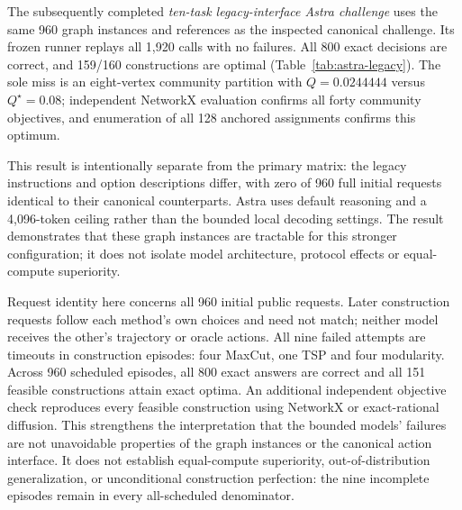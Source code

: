 The subsequently completed \emph{ten-task legacy-interface Astra challenge}
uses the same 960 graph instances and references as the inspected canonical
challenge. Its frozen runner replays all 1,920 calls with no failures.
All 800 exact decisions are correct, and 159/160 constructions are optimal
(Table~\ref{tab:astra-legacy}). The sole miss is an eight-vertex community
partition with $Q=0.0244444$ versus $Q^\star=0.08$; independent NetworkX
evaluation confirms all forty community objectives, and enumeration of all
128 anchored assignments confirms this optimum.

This result is intentionally separate from the primary matrix: the legacy
instructions and option descriptions differ, with zero of 960 full initial
requests identical to their canonical counterparts. Astra uses default
reasoning and a 4,096-token ceiling rather than the bounded local decoding
settings. The result demonstrates that these graph instances are tractable
for this stronger configuration; it does not isolate model architecture,
protocol effects or equal-compute superiority.

\begin{table}[t]
\centering\small

\caption{Completed Astra legacy-interface challenge on the same graphs as
the inspected primary challenge. The first six rows report correct answers;
the final four report optimum hits. Mean gaps are task-specific and are not
pooled. This is a separate protocol/default-reasoning reference, not an
additional column of the canonical four-method matrix.}
\label{tab:astra-legacy}
\end{table}


Request identity here concerns all 960 initial public requests. Later
construction requests follow each method's own choices and need not match;
neither model receives the other's trajectory or oracle actions.
All nine failed attempts are timeouts in construction episodes: four MaxCut,
one TSP and four modularity. Across 960 scheduled episodes, all 800 exact
answers are correct and all 151 feasible constructions attain exact optima.
An additional independent objective check reproduces every feasible
construction using NetworkX or exact-rational diffusion. This strengthens
the interpretation that the bounded models' failures are not unavoidable
properties of the graph instances or the canonical action interface.
It does not establish equal-compute superiority, out-of-distribution
generalization, or unconditional construction perfection: the nine incomplete
episodes remain in every all-scheduled denominator.

